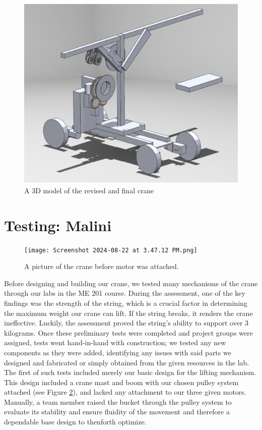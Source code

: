 \documentclass[letterpaper, 12pt]{article}
\begin{document}
\begin{figure}[H]
    \centering
    \caption{A 3D model of the revised and final crane}
    \label{fig:2}
    \includegraphics[width = \textwidth]{Crane Render 2.png}
\end{figure}

\section{Testing: Malini}
\begin{figure}[H]
    \centering
    \texttt{[image: Screenshot 2024-08-22 at 3.47.12 PM.png]}
    \caption{A picture of the crane before motor was attached.}
    \label{fig:pic of Crane}
\end{figure}

Before designing and building our crane, we tested many mechanisms of the crane through our labs in the ME 201 course. 
During the assessment, one of the key findings was the strength of the string, which is a crucial factor in determining the maximum weight our crane can lift. 
If the string breaks, it renders the crane ineffective.
Luckily, the assessment proved the string’s ability to support over 3 kilograms.
Once these preliminary tests were completed and project groups were assigned, tests went hand-in-hand with construction; we tested any new components as they were added, identifying any issues with said parts we designed and fabricated or simply obtained from the given resources in the lab. 
The first of such tests included merely our basic design for the lifting mechanism. 
This design included a crane mast and boom with our chosen pulley system attached (see Figure \ref{fig:pic of Crane}), and lacked any attachment to our three given motors. 
Manually, a team member raised the bucket through the pulley system to evaluate its stability and ensure fluidity of the movement and therefore a dependable base design to thenforth optimize. 
\end{document}
